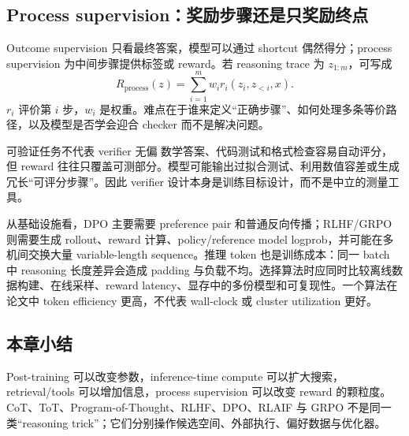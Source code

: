 \subsection{Process supervision：奖励步骤还是只奖励终点}

Outcome supervision 只看最终答案，模型可以通过 shortcut 偶然得分；process supervision 为中间步骤提供标签或 reward。若 reasoning trace 为 $z_{1:m}$，可写成
\[
R_{\mathrm{process}}(z)=\sum_{i=1}^{m}w_i r_i(z_i,z_{<i},x).
\]
$r_i$ 评价第 $i$ 步，$w_i$ 是权重。难点在于谁来定义“正确步骤”、如何处理多条等价路径，以及模型是否学会迎合 checker 而不是解决问题。



\begin{warningbox}{可验证任务不代表 verifier 无偏}
数学答案、代码测试和格式检查容易自动评分，但 reward 往往只覆盖可测部分。模型可能输出过拟合测试、利用数值容差或生成冗长“可评分步骤”。因此 verifier 设计本身是训练目标设计，而不是中立的测量工具。
\end{warningbox}

从基础设施看，DPO 主要需要 preference pair 和普通反向传播；RLHF/GRPO 则需要生成 rollout、reward 计算、policy/reference model logprob，并可能在多机间交换大量 variable-length sequence。推理 token 也是训练成本：同一 batch 中 reasoning 长度差异会造成 padding 与负载不均。选择算法时应同时比较离线数据构建、在线采样、reward latency、显存中的多份模型和可复现性。一个算法在论文中 token efficiency 更高，不代表 wall-clock 或 cluster utilization 更好。

\subsection{本章小结}

Post-training 可以改变参数，inference-time compute 可以扩大搜索，retrieval/tools 可以增加信息，process supervision 可以改变 reward 的颗粒度。CoT、ToT、Program-of-Thought、RLHF、DPO、RLAIF 与 GRPO 不是同一类“reasoning trick”；它们分别操作候选空间、外部执行、偏好数据与优化器。

